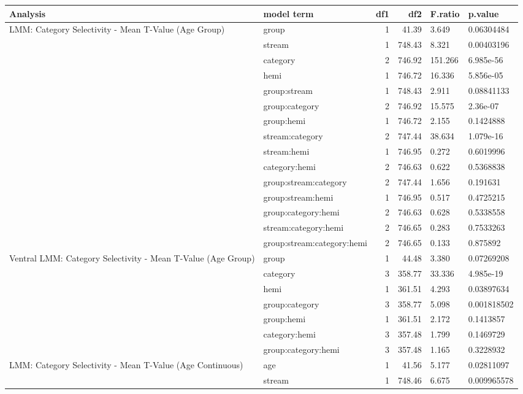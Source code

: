 \begin{table}
\centering
\begin{tabular}{llrrll}
\toprule
Analysis & model term & df1 & df2 & F.ratio & p.value\\
\midrule
LMM: Category Selectivity - Mean T-Value (Age Group) & group & 1 & 41.39 & 3.649 & 0.06304484\\
 & stream & 1 & 748.43 & 8.321 & 0.00403196\\
 & category & 2 & 746.92 & 151.266 & 6.985e-56\\
 & hemi & 1 & 746.72 & 16.336 & 5.856e-05\\
 & group:stream & 1 & 748.43 & 2.911 & 0.08841133\\
\addlinespace
 & group:category & 2 & 746.92 & 15.575 & 2.36e-07\\
 & group:hemi & 1 & 746.72 & 2.155 & 0.1424888\\
 & stream:category & 2 & 747.44 & 38.634 & 1.079e-16\\
 & stream:hemi & 1 & 746.95 & 0.272 & 0.6019996\\
 & category:hemi & 2 & 746.63 & 0.622 & 0.5368838\\
\addlinespace
 & group:stream:category & 2 & 747.44 & 1.656 & 0.191631\\
 & group:stream:hemi & 1 & 746.95 & 0.517 & 0.4725215\\
 & group:category:hemi & 2 & 746.63 & 0.628 & 0.5338558\\
 & stream:category:hemi & 2 & 746.65 & 0.283 & 0.7533263\\
 & group:stream:category:hemi & 2 & 746.65 & 0.133 & 0.875892\\
\addlinespace
Ventral LMM: Category Selectivity - Mean T-Value  (Age Group) & group & 1 & 44.48 & 3.380 & 0.07269208\\
 & category & 3 & 358.77 & 33.336 & 4.985e-19\\
 & hemi & 1 & 361.51 & 4.293 & 0.03897634\\
 & group:category & 3 & 358.77 & 5.098 & 0.001818502\\
 & group:hemi & 1 & 361.51 & 2.172 & 0.1413857\\
\addlinespace
 & category:hemi & 3 & 357.48 & 1.799 & 0.1469729\\
 & group:category:hemi & 3 & 357.48 & 1.165 & 0.3228932\\
LMM: Category Selectivity - Mean T-Value  (Age Continuous) & age & 1 & 41.56 & 5.177 & 0.02811097\\
 & stream & 1 & 748.46 & 6.675 & 0.009965578\\

\end{tabular}
\end{table}
